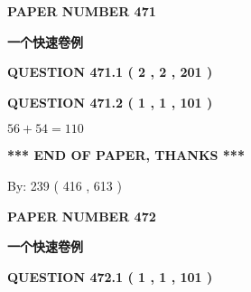 \documentclass{ctexart}
\begin{document}
   
 {\textbf{ \Large{ PAPER NUMBER  471  }}}
   
   
\vspace{0.2in}
   
   
   
   
   
   
 \vspace{0.2in}
{\LARGE {\textbf{ 一个快速卷例}}}
   
   
  
\vspace{0.2in}
  
{\textbf{\Large{QUESTION
471.1 
 ( 2 , 2 , 201 )
}}}
  
  
  
\vspace{0.2in}
  
{\textbf{\Large{QUESTION
471.2 
 ( 1 , 1 , 101 )
}}}
  
  
 
 

$ %
56 +  %
54=   %
110$
 
 
   
   
 \vspace{0.2in}
 
   
   
   
   
\vspace{1.0in} 
{\textbf{\large{ *** END OF PAPER, THANKS *** }}} 
   
   
\hspace{1.0in} By: 
 239 ( 416 ,  613 )
   
   
   
   
\newpage 
\setcounter{page}{ 
   472001 } 
   
   
   
   
 {\textbf{ \Large{ PAPER NUMBER  472  }}}
   
   
\vspace{0.2in}
   
   
   
   
   
   
 \vspace{0.2in}
{\LARGE {\textbf{ 一个快速卷例}}}
   
   
  
\vspace{0.2in}
  
{\textbf{\Large{QUESTION
472.1 
 ( 1 , 1 , 101 )
}}}
  
\end{document}
